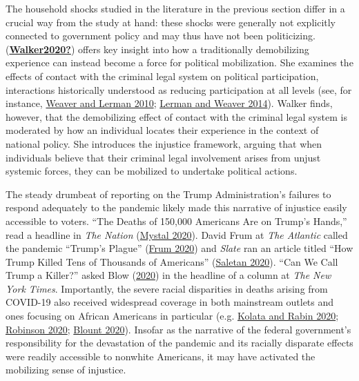 \documentclass[
  12pt,
]{article}
\begin{document}
The household shocks studied in the literature in the previous section differ in a crucial way from the study at hand: these shocks were generally not explicitly connected to government policy and may thus have not been politicizing. (\protect\hyperlink{ref-Walker2020}{\textbf{Walker2020?}}) offers key insight into how a traditionally demobilizing experience can instead become a force for political mobilization. She examines the effects of contact with the criminal legal system on political participation, interactions historically understood as reducing participation at all levels (see, for instance, \protect\hyperlink{ref-Weaver2010}{Weaver and Lerman 2010}; \protect\hyperlink{ref-Lerman2014}{Lerman and Weaver 2014}). Walker finds, however, that the demobilizing effect of contact with the criminal legal system is moderated by how an individual locates their experience in the context of national policy. She introduces the injustice framework, arguing that when individuals believe that their criminal legal involvement arises from unjust systemic forces, they can be mobilized to undertake political actions.

The steady drumbeat of reporting on the Trump Administration's failures to respond adequately to the pandemic likely made this narrative of injustice easily accessible to voters. ``The Deaths of 150,000 Americans Are on Trump's Hands,'' read a headline in \emph{The Nation} (\protect\hyperlink{ref-Mystal2020}{Mystal 2020}). David Frum at \emph{The Atlantic} called the pandemic ``Trump's Plague'' (\protect\hyperlink{ref-Frum2020}{Frum 2020}) and \emph{Slate} ran an article titled ``How Trump Killed Tens of Thousands of Americans'' (\protect\hyperlink{ref-Saletan2020}{Saletan 2020}). ``Can We Call Trump a Killer?'' asked Blow (\protect\hyperlink{ref-Blow2020}{2020}) in the headline of a column at \emph{The New York Times}. Importantly, the severe racial disparities in deaths arising from COVID-19 also received widespread coverage in both mainstream outlets and ones focusing on African Americans in particular (e.g. \protect\hyperlink{ref-Kolata2020}{Kolata and Rabin 2020}; \protect\hyperlink{ref-Robinson2020}{Robinson 2020}; \protect\hyperlink{ref-Blount2020}{Blount 2020}). Insofar as the narrative of the federal government's responsibility for the devastation of the pandemic and its racially disparate effects were readily accessible to nonwhite Americans, it may have activated the mobilizing sense of injustice.
\end{document}
